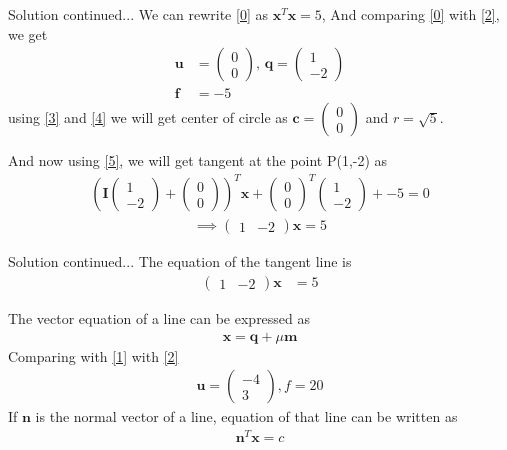 \documentclass{beamer}
\renewcommand{\vec}[1]{\mathbf{#1}}
\providecommand{\brak}[1]{\ensuremath{\left(#1\right)}}
\theoremstyle{remark}
\newcommand{\myvec}[1]{\ensuremath{\begin{pmatrix}#1\end{pmatrix}}}
\numberwithin{equation}{subsection}
\let\vec\mathbf
\begin{document}
\begin{frame}{Solution continued...}
    We can rewrite \eqref{0} as $\vec{x}^T\vec{x} = 5$, And comparing \eqref{0} with \eqref{2}, we get
\begin{align}
    \vec{u}&=\myvec{0\\0},\, \vec{q}= \myvec{1\\-2}\\
    \vec{f}&=-5
\end{align}
using \eqref{3} and \eqref{4} we will get center of circle as $\vec{c} = \myvec{0\\0}$ and $r= \sqrt{5}$.

And now using \eqref{5}, we will get tangent at the point P(1,-2) as
\begin{align}
    \brak{\vec{I}\myvec{1\\-2}+\myvec{0\\0}}^T\vec{x}+\myvec{0\\0}^T\myvec{1\\-2}+{-5} = 0
\end{align}
\begin{align}
    \implies \myvec{1&-2}\vec{x}= 5
\end{align}
\end{frame}
\begin{frame}{Solution continued...}
    The equation of the tangent line is
    \begin{align}
    \myvec{1&-2}\vec{x}&= 5 \label{a}
    \end{align}

    The vector equation of a line can be expressed as 
    \begin{align}
        \vec{x} = \vec{q} +\mu\vec{m}\label{c}
    \end{align}
Comparing  with \eqref{1} with \eqref{2}
\begin{align}
\vec{u}=\myvec{-4 \\ 3}, f=20
\end{align}
If $\vec{n}$ is the normal vector of a line, equation of that line can be written as 
\begin{align}
\vec{n}^T\vec{x} = c \label{b}
\end{align}
\end{frame}
\end{document}
